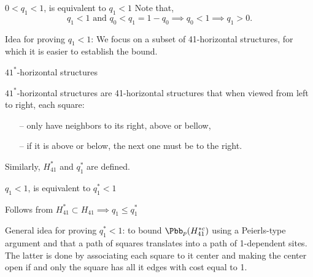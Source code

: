 \documentclass[11pt, mathserif]{beamer}
\begin{document}
    \begin{frame}{\large \textcolor{blendedblue}{$0 < q_1 < 1$, is equivalent to $q_1 < 1$}}
        Note that, $$q_1 < 1 \text{ and } q_0 < q_1 = 1 - q_0  \implies q_0 < 1 \implies q_1 > 0.$$

        \pause
        \vspace{0.3cm}
        \textcolor{blendedblue}{Idea for proving $q_1 < 1$:} We focus on a subset of 41-horizontal structures, for which it is easier to establish the bound.
    \end{frame}

    \begin{frame}{$41^*$-horizontal structures}
        \vspace{0.5cm}
         

        \vspace{0.5cm}
        \begin{definition}\label{definition_structures_restricted_game2}
            $41^*$-horizontal structures are 41-horizontal structures that when viewed from left to right, each square:
            \begin{itemize}
                \item[--] only have neighbors to its right, above or bellow,
                \item[--] if it is above or below, the next one must be to the right.
            \end{itemize}
        \end{definition}

        \vspace{0.5cm}
        Similarly, \textcolor{blendedblue}{$H_{41}^*$} and \textcolor{blendedblue}{$q_1^*$} are defined.
    \end{frame}

    \begin{frame}
        {\large \textcolor{blendedblue}{$q_1 < 1$, is equivalent to $q_1^* < 1$}}
        
        Follows from $H_{41}^* \subset H_{41} \implies q_1 \leq q_1^*$

        \vspace{0.7cm}
        \pause

        \textcolor{blendedblue}{General idea for proving $q_1^* < 1$:} to bound $\Pbb_p(H_{41}^{*c})$ using a Peierls-type argument and that a path of squares translates into a path of 1-dependent sites. The latter is done by associating each square to it center and making the center open if and only the square has all it edges with cost equal to 1.
    \end{frame}
\end{document}
